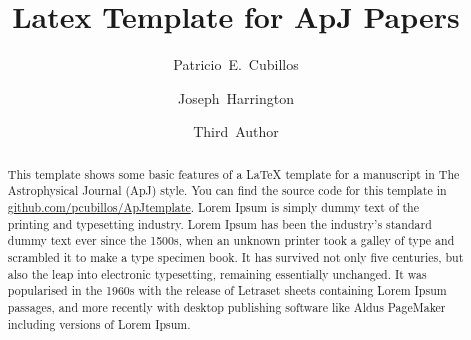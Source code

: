 





\title{Latex Template for ApJ Papers}


\author{Patricio~E.~Cubillos}

\author{Joseph~Harrington}

\author{Third~Author}




\begin{abstract}
  This template shows some basic features of a LaTeX template for a
  manuscript in The Astrophysical Journal (ApJ) style.  You can find
  the source code for this template in
  \href{https://github.com/pcubillos/ApJtemplate}
  {github.com/pcubillos/ApJtemplate}.
  Lorem Ipsum is simply dummy text of the printing and typesetting
  industry. Lorem Ipsum has been the industry's standard dummy text ever
  since the 1500s, when an unknown printer took a galley of type and
  scrambled it to make a type specimen book. It has survived not only
  five centuries, but also the leap into electronic typesetting,
  remaining essentially unchanged. It was popularised in the 1960s with
  the release of Letraset sheets containing Lorem Ipsum passages, and
  more recently with desktop publishing software like Aldus PageMaker
  including versions of Lorem Ipsum.
\end{abstract}

